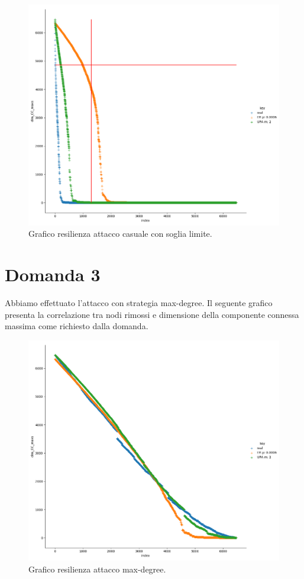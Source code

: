 \documentclass{article}
\begin{document}
\begin{figure}[H]
	\centering
	\includegraphics[width=1.00\textwidth]{figures/figure_maxdegree_line}
	\caption{Grafico resilienza attacco casuale con soglia limite.}
\end{figure}

\newpage
	\section*{Domanda 3}
	Abbiamo effettuato l'attacco con strategia max-degree. Il seguente grafico presenta la correlazione tra nodi rimossi e dimensione della componente connessa massima come richiesto dalla domanda.
	\begin{figure}[H]
		\centering
		\includegraphics[width=1.0\textwidth]{figures/figure_random}
		\caption{Grafico resilienza attacco max-degree.}
	\end{figure}
\newpage
\end{document}
